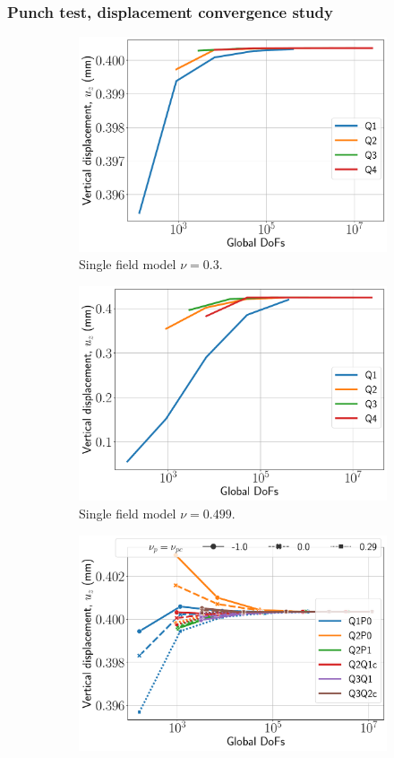 \documentclass{beamer}
\begin{document}
\begin{frame}
	\frametitle{Punch test, displacement convergence study}
	\begin{figure}[H]
		\begin{subfigure}{.5\textwidth}
			\centering
			\includegraphics[width=.8\textwidth]{../figs/u-punch2-iso-0.3.pdf}
			\caption{Single field model $\nu = 0.3$.}
		\end{subfigure}%
		\begin{subfigure}{.5\textwidth}
			\centering
			\includegraphics[width=.8\textwidth]{../figs/u-punch2-iso-0.499.pdf}
			\caption{Single field model $\nu = 0.499$.}
		\end{subfigure}
		\begin{subfigure}{.5\textwidth}
			\centering
			\includegraphics[width=.8\textwidth]{../figs/u-punch2-mixed-0.3.pdf}

\end{subfigure}
\end{figure}
\end{frame}
\end{document}
